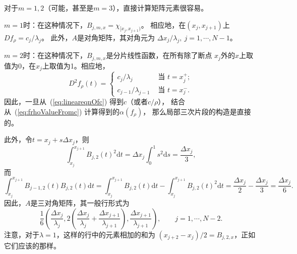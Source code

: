 对于$m=1,2$（可能，甚至是$m=3$），直接计算矩阵元素很容易。

$m=1$时：在这种情况下，$B_{j,m,x}=\chi_{[x_{j},x_{j+1})}$。
相应地，在$(x_{j},x_{j+1})$上$Df_{\rho}=c_{j}/\lambda_{j}$。
此外，$A$是对角矩阵，其对角元为
$\Delta x_{j}/\lambda_{j},\ j=1,\cdots,N-1$。

$m=2$时：在这种情况下，$B_{j,m,x}$是分片线性函数，在所有除了断点
$x_{j}$外的$x$上取值为0，在$x_{j}$上取值为1。相应地，
\begin{displaymath}
  D^{2}f_{\rho}(t)=
  \begin{cases}
    c_{j}/\lambda_{j}&\text{ 当 }t=x_{j}^{+};\\
    c_{j-1}/\lambda_{j-1}&\text{ 当 }t=x_{j}^{-}.
  \end{cases}
\end{displaymath}
因此，一旦从~(\ref{eq:lineareqnOfc}) 得到$c$（或者$c/\rho$），
结合从~(\ref{eq:frhoValueFromc}) 计算得到的$\alpha(f_{\rho})$，
那么局部三次片段的构造是直接的。

此外，令$t=x_{j}+s\Delta x_{j}$，则
\begin{displaymath}
  \int_{x_{j}}^{x_{j+1}}B_{j,2}(t)^{2}\mathrm{d}t
  =\Delta x_{j}\int_{0}^{1}s^{2}\mathrm{d}s=\frac{\Delta x_{j}}{3},
\end{displaymath}
而
\begin{displaymath}
  \int_{x_{j}}^{x_{j+1}}B_{j-1,2}(t)B_{j,2}(t)\mathrm{d}t
  =\int_{x_{j}}^{x_{j+1}}B_{j,2}(t)\mathrm{d}t
  -\int_{x_{j}}^{x_{j+1}}B_{j,2}(t)^{2}\mathrm{d}t
  =\frac{\Delta x_{j}}{2}-\frac{\Delta x_{j}}{3}
  =\frac{\Delta x_{j}}{6}.
\end{displaymath}
因此，$A$是三对角矩阵，其一般行形式为
\begin{displaymath}
  \frac{1}{6}
  \left( \frac{\Delta x_{j}}{\lambda_{j}},
    2 \left( \frac{\Delta x_{j}}{\lambda_{j}}+
      \frac{\Delta x_{j+1}}{\lambda_{j+1}}\right),
    \frac{\Delta x_{j+1}}{\lambda_{j+1}}
  \right),
  \qquad j=1,\cdots, N-2.
\end{displaymath}
注意，对于$\lambda=1$，这样的行中的元素相加的和为
$(x_{j+2}-x_{j})/2=B_{j,2,x}$，正如它们应该的那样。

